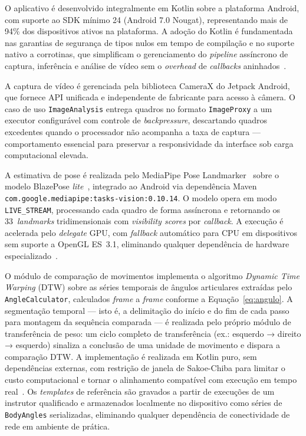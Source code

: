 O aplicativo é desenvolvido integralmente em Kotlin sobre a plataforma Android, com suporte
ao SDK mínimo 24 (Android 7.0 Nougat), representando mais de 94\% dos dispositivos ativos na
plataforma. A adoção do Kotlin é fundamentada nas garantias de segurança de tipos nulos em
tempo de compilação e no suporte nativo a corrotinas, que simplificam o gerenciamento do
\textit{pipeline} assíncrono de captura, inferência e análise de vídeo sem o \textit{overhead}
de \textit{callbacks} aninhados~\cite{jemerov2017kotlin}.

A captura de vídeo é gerenciada pela biblioteca CameraX do Jetpack Android, que fornece API
unificada e independente de fabricante para acesso à câmera. O caso de uso
\texttt{ImageAnalysis} entrega quadros no formato \texttt{ImageProxy} a um executor
configurável com controle de \textit{backpressure}, descartando quadros excedentes quando o
processador não acompanha a taxa de captura --- comportamento essencial para preservar a
responsividade da interface sob carga computacional elevada.

A estimativa de pose é realizada pelo MediaPipe Pose Landmarker~\cite{lugaresi2019mediapipe}
sobre o modelo BlazePose \textit{lite}~\cite{bazarevsky2020blazeposeondevicerealtimebody},
integrado ao Android via dependência Maven
\texttt{com.google.mediapipe:tasks-vision:0.10.14}. O modelo opera em modo
\texttt{LIVE\_STREAM}, processando cada quadro de forma assíncrona e retornando os
33~\textit{landmarks} tridimensionais com \textit{visibility scores} por \textit{callback}.
A execução é acelerada pelo \textit{delegate} GPU, com \textit{fallback} automático para CPU
em dispositivos sem suporte a OpenGL ES~3.1, eliminando qualquer dependência de hardware
especializado~\cite{lee2019ondevice}.

O módulo de comparação de movimentos implementa o algoritmo \textit{Dynamic Time Warping}
(DTW) sobre as séries temporais de ângulos articulares extraídas pelo
\texttt{AngleCalculator}, calculados \textit{frame} a \textit{frame} conforme a
Equação~\ref{eq:angulo}. A segmentação temporal --- isto é, a delimitação do início e do
fim de cada passo para montagem da sequência comparada --- é realizada pelo próprio módulo
de transferência de peso: um ciclo completo de transferência (ex.: esquerdo → direito →
esquerdo) sinaliza a conclusão de uma unidade de movimento e dispara a comparação DTW.
A implementação é realizada em Kotlin puro, sem dependências externas, com restrição de
janela de Sakoe-Chiba para limitar o custo computacional e tornar o alinhamento compatível
com execução em tempo real~\cite{dynamic_dance_warping}. Os \textit{templates} de
referência são gravados a partir de execuções de um instrutor qualificado e armazenados
localmente no dispositivo como séries de \texttt{BodyAngles} serializadas, eliminando
qualquer dependência de conectividade de rede em ambiente de prática.

